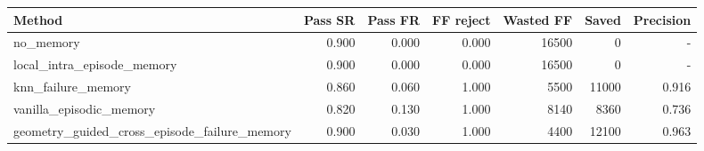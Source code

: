 \begin{tabular}{lrrrrrr}
\toprule
Method & Pass SR & Pass FR & FF reject & Wasted FF & Saved & Precision \\
\midrule
no\_memory & 0.900 & 0.000 & 0.000 & 16500 & 0 & - \\
local\_intra\_episode\_memory & 0.900 & 0.000 & 0.000 & 16500 & 0 & - \\
knn\_failure\_memory & 0.860 & 0.060 & 1.000 & 5500 & 11000 & 0.916 \\
vanilla\_episodic\_memory & 0.820 & 0.130 & 1.000 & 8140 & 8360 & 0.736 \\
geometry\_guided\_cross\_episode\_failure\_memory & 0.900 & 0.030 & 1.000 & 4400 & 12100 & 0.963 \\
\bottomrule
\end{tabular}
